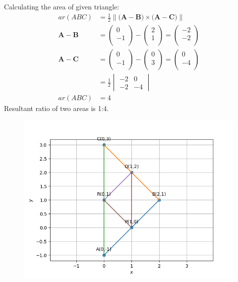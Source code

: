 \documentclass[12pt]{article}
\newcommand{\mydet}[1]{\ensuremath{\begin{vmatrix}#1\end{vmatrix}}}
\providecommand{\norm}[1]{\left\lVert#1\right\rVert}
\newcommand{\myvec}[1]{\ensuremath{\begin{pmatrix}#1\end{pmatrix}}}
\let\vec\mathbf
\begin{document}
Calculating the area of given triangle:
	\begin{align}
		ar(ABC)&=\frac{1}{2}{\norm{\vec(\vec{A}-\vec{B})\times\vec(\vec{A}-\vec{C})}}\\
		\vec{A}-\vec{B} &=  \myvec{
  0 \\
  -1 \\
 } - \myvec{
  2 \\
  1 \\
 } = \myvec{
 -2 \\
 -2 \\
 }
 \\
		\vec{A}-\vec{C} &=  \myvec{
  0 \\
  -1 \\
 } - \myvec{
  0 \\
  3 \\
 } = \myvec{
 0 \\
 -4 \\
 }
 \\
		&=\frac{1}{2}\mydet{-2 & 0\\-2 & -4}\\
		ar(ABC)&=4
	\end{align}
	Resultant ratio of two areas is 1:4.
\begin{figure}[!h]
	\begin{center} 
	    \includegraphics[width=\columnwidth]{./figs/trigraph.png}
	\end{center}
\caption{}
\label{fig:Fig}
\end{figure}
\end{document}
